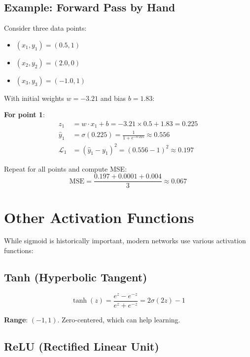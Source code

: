 \subsection{Example: Forward Pass by Hand}

Consider three data points:
\begin{itemize}
    \item $(x_1, y_1) = (0.5, 1)$
    \item $(x_2, y_2) = (2.0, 0)$
    \item $(x_3, y_3) = (-1.0, 1)$
\end{itemize}

With initial weights $w = -3.21$ and bias $b = 1.83$:

\textbf{For point 1}:
\begin{align*}
z_1 &= w \cdot x_1 + b = -3.21 \times 0.5 + 1.83 = 0.225 \\
\hat{y}_1 &= \sigma(0.225) = \frac{1}{1 + e^{-0.225}} \approx 0.556 \\
\mathcal{L}_1 &= (\hat{y}_1 - y_1)^2 = (0.556 - 1)^2 \approx 0.197
\end{align*}

Repeat for all points and compute MSE:
\[
\text{MSE} = \frac{0.197 + 0.0001 + 0.004}{3} \approx 0.067
\]


\section{Other Activation Functions}

While sigmoid is historically important, modern networks use various activation functions:

\subsection{Tanh (Hyperbolic Tangent)}

\[
\tanh(z) = \frac{e^z - e^{-z}}{e^z + e^{-z}} = 2\sigma(2z) - 1
\]

\textbf{Range}: $(-1, 1)$. Zero-centered, which can help learning.

\subsection{ReLU (Rectified Linear Unit)}

